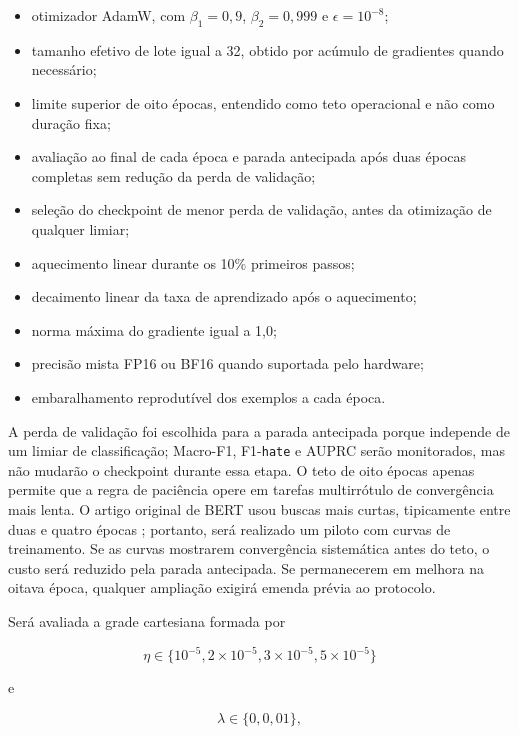 \begin{itemize}
    \item otimizador AdamW, com $\beta_1=0{,}9$, $\beta_2=0{,}999$ e
    $\epsilon=10^{-8}$;
    \item tamanho efetivo de lote igual a 32, obtido por acúmulo de gradientes
    quando necessário;
    \item limite superior de oito épocas, entendido como teto operacional e não
    como duração fixa;
    \item avaliação ao final de cada época e parada antecipada após duas épocas
    completas sem redução da perda de validação;
    \item seleção do checkpoint de menor perda de validação, antes da otimização
    de qualquer limiar;
    \item aquecimento linear durante os 10\% primeiros passos;
    \item decaimento linear da taxa de aprendizado após o aquecimento;
    \item norma máxima do gradiente igual a 1,0;
    \item precisão mista FP16 ou BF16 quando suportada pelo hardware;
    \item embaralhamento reprodutível dos exemplos a cada época.
\end{itemize}

A perda de validação foi escolhida para a parada antecipada porque independe de
um limiar de classificação; Macro-F1, F1-\texttt{hate} e AUPRC serão monitorados,
mas não mudarão o checkpoint durante essa etapa. O teto de oito épocas apenas
permite que a regra de paciência opere em tarefas multirrótulo de convergência
mais lenta. O artigo original de BERT usou buscas mais curtas, tipicamente entre
duas e quatro épocas \cite{devlin2019bert}; portanto, será realizado um piloto
com curvas de treinamento. Se as curvas mostrarem convergência sistemática antes
do teto, o custo será reduzido pela parada antecipada. Se permanecerem em melhora
na oitava época, qualquer ampliação exigirá emenda prévia ao protocolo.

Será avaliada a grade cartesiana formada por

\begin{equation}
    \eta \in \{10^{-5}, 2\times10^{-5}, 3\times10^{-5}, 5\times10^{-5}\}
\end{equation}

e

\begin{equation}
    \lambda \in \{0, 0{,}01\},
\end{equation}

